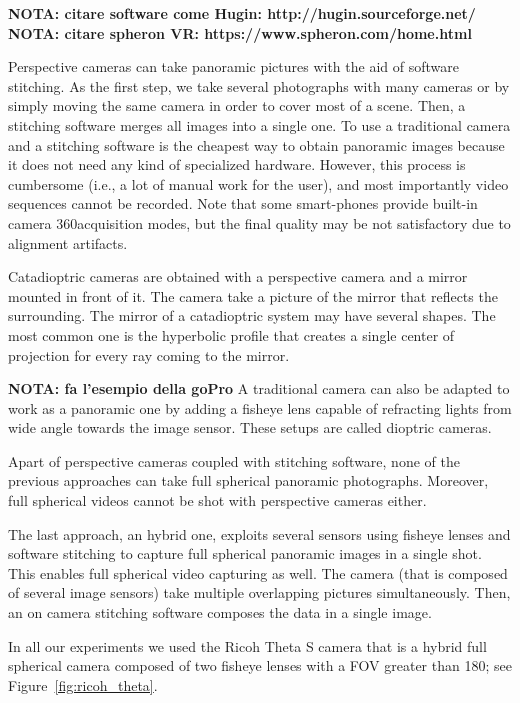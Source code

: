 \textbf{NOTA: citare software come Hugin: http://hugin.sourceforge.net/}
\textbf{NOTA: citare spheron VR: https://www.spheron.com/home.html}

Perspective cameras can take panoramic pictures with the aid of software stitching. As the first step, we take several photographs with many cameras or by simply moving the same camera in order to cover most of a scene. Then, a stitching software merges all images into a single one. To use a traditional camera and a stitching software is the cheapest way to obtain panoramic images because it does not need any kind of specialized hardware. However, this process is cumbersome (i.e., a lot of manual work for the user), and most importantly video sequences cannot be recorded. Note that some smart-phones provide built-in camera 360\degree acquisition modes, but the final quality may be not satisfactory due to alignment artifacts.

Catadioptric cameras are obtained with a perspective camera and a mirror mounted in front of it. The camera take a picture of the mirror that reflects the surrounding. The mirror of a catadioptric system may have several shapes. The most common one is the hyperbolic profile that creates a single center of 
projection for every ray coming to the mirror.

\textbf{NOTA: fa l'esempio della goPro}
A traditional camera can also be adapted to work as a panoramic one by adding a fisheye lens capable of refracting lights from wide angle towards the image sensor. These setups are called dioptric cameras.

Apart of perspective cameras coupled with stitching software, none of the previous approaches can take full spherical panoramic photographs. Moreover, full spherical videos cannot be shot with perspective cameras either.

The last approach, an hybrid one, exploits several sensors using fisheye lenses and software stitching to capture full spherical panoramic images in a single shot. This enables full spherical video capturing as well. The camera (that is composed of several image sensors) take multiple overlapping pictures simultaneously. Then, an on camera stitching software composes the data in a single image.

In all our experiments we used the Ricoh Theta S camera that is a hybrid full spherical camera 
composed of two fisheye lenses with a FOV greater than 180\degree; see Figure~\ref{fig:ricoh_theta}.
%
%

